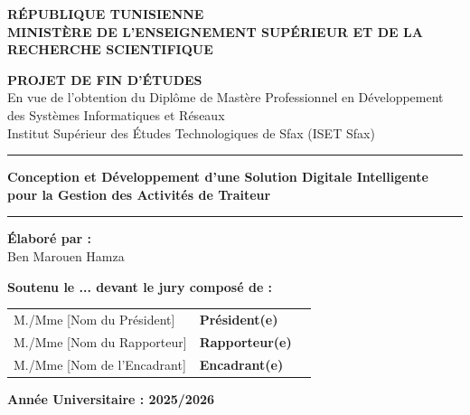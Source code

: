 \begin{titlepage}
    \begin{center}
        
        \vspace*{1cm}
        
        \textbf{\Large RÉPUBLIQUE TUNISIENNE}\\
        \vspace{0.3cm}
        \textbf{\Large MINISTÈRE DE L'ENSEIGNEMENT SUPÉRIEUR ET DE LA RECHERCHE SCIENTIFIQUE}\\
        \vspace{0.8cm}
        
        \vspace{1cm}
        
        \textbf{\LARGE PROJET DE FIN D'ÉTUDES}\\
        \vspace{0.5cm}
        \large En vue de l'obtention du Diplôme de Mastère Professionnel en Développement des Systèmes Informatiques et Réseaux\\
        \vspace{0.2cm}
        \large Institut Supérieur des Études Technologiques de Sfax (ISET Sfax)\\
        \vspace{1cm}
        \vspace{1cm}
        
        \hrule
        \vspace{0.5cm}
        \textbf{\huge Conception et Développement d'une Solution Digitale Intelligente pour la Gestion des Activités de Traiteur}\\
        \vspace{0.5cm}
        \hrule
        
        \vspace{2cm}
        
        \textbf{\Large Élaboré par :}\\
        \vspace{0.2cm}
        {\Large Ben Marouen Hamza}\\
        
        \vspace{2cm}
        
        \textbf{\Large Soutenu le ... devant le jury composé de :}\\
        \vspace{0.5cm}
        \begin{tabular}{lll}
            M./Mme [Nom du Président] & \textbf{Président(e)} \\
            M./Mme [Nom du Rapporteur] & \textbf{Rapporteur(e)} \\
            M./Mme [Nom de l'Encadrant] & \textbf{Encadrant(e)} \\
        \end{tabular}
        
        \vfill
        
        \textbf{Année Universitaire : 2025/2026}
        
    \end{center}
\end{titlepage}
